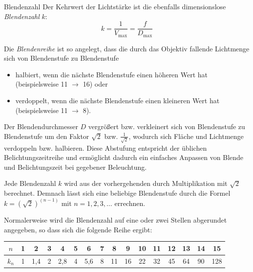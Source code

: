 \begin{defi}{Blendenzahl}
    Der Kehrwert der Lichtstärke ist die ebenfalls dimensionslose \emph{Blendenzahl} $k$:
    \[
        k = \frac{1}{V_{\max}} = \frac{f}{D_{\max}}
    \]

    Die \emph{Blendenreihe} ist so angelegt, dass die durch das Objektiv fallende Lichtmenge sich von Blendenstufe zu Blendenstufe
    \begin{itemize}
        \item halbiert, wenn die nächste Blendenstufe einen höheren Wert hat (beispielsweise 11 $\to$ 16) oder
        \item verdoppelt, wenn die nächste Blendenstufe einen kleineren Wert hat (beispielsweise 11 $\to$ 8).
    \end{itemize}

    Der Blendendurchmesser $D$ vergrößert bzw. verkleinert sich von Blendenstufe zu Blendenstufe um den Faktor $\sqrt{2}$ bzw. $\frac{1}{\sqrt{2}}$, wodurch sich Fläche und Lichtmenge verdoppeln bzw. halbieren.
    Diese Abstufung entspricht der üblichen Belichtungszeitreihe und ermöglicht dadurch ein einfaches Anpassen von Blende und Belichtungszeit bei gegebener Beleuchtung.

    Jede Blendenzahl $k$ wird aus der vorhergehenden durch Multiplikation mit $\sqrt{2}$ berechnet.
    Demnach lässt sich eine beliebige Blendenstufe durch die Formel $k=({\sqrt{2}})^{{(n-1)}}$ mit $n=1,2,3,\dots$ errechnen.

    Normalerweise wird die Blendenzahl auf eine oder zwei Stellen abgerundet angegeben, so dass sich die folgende Reihe ergibt:

    \centering
    \begin{tabular}{c|ccccccccccccccc}
        \toprule
        $n$   & 1 & 2   & 3 & 4   & 5 & 6   & 7 & 8  & 9  & 10 & 11 & 12 & 13 & 14 & 15  \\
        \midrule
        $k_n$ & 1 & 1,4 & 2 & 2,8 & 4 & 5,6 & 8 & 11 & 16 & 22 & 32 & 45 & 64 & 90 & 128 \\
        \bottomrule
    \end{tabular}
\end{defi}

